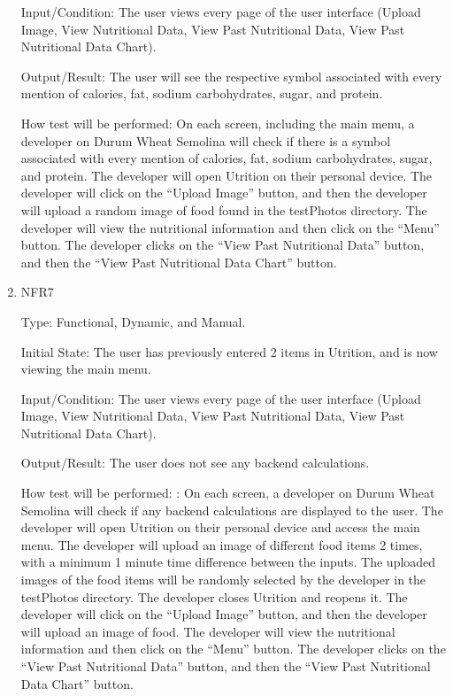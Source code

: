\documentclass[12pt, titlepage]{article}
\begin{document}
\begin{enumerate}
		Input/Condition: The user views every page of the user interface (Upload Image, View Nutritional Data, View Past Nutritional Data, View Past Nutritional Data Chart).
		
		Output/Result: The user will see the respective symbol associated with every mention of calories, fat, sodium carbohydrates, sugar, and protein.
		
		How test will be performed: On each screen, including the main menu, a developer on Durum Wheat Semolina will check if there is a symbol associated with every mention of calories, fat, sodium carbohydrates, sugar, and protein. The developer will open Utrition on their personal device. The developer will click on the “Upload Image” button, and then the developer will upload a random image of food found in the testPhotos directory. The developer will view the nutritional information and then click on the “Menu” button. The developer clicks on the “View Past Nutritional Data” button, and then the “View Past Nutritional Data Chart” button.
		
		\item{NFR7\\}
		
		Type: Functional, Dynamic, and Manual.
		
		Initial State: The user has previously entered 2 items in Utrition, and is now viewing the main menu.
		
		Input/Condition: The user views every page of the user interface (Upload Image, View Nutritional Data, View Past Nutritional Data, View Past Nutritional Data Chart).
		
		Output/Result: The user does not see any backend calculations.
		
		How test will be performed: : On each screen, a developer on Durum Wheat Semolina will check if any backend calculations are displayed to the user. The developer will open Utrition on their personal device and access the main menu. The developer will upload an image of different food items 2 times, with a minimum 1 minute time difference between the inputs. The uploaded images of the food items will be randomly selected by the developer in the testPhotos directory. The developer closes Utrition and reopens it. The developer will click on the “Upload Image” button, and then the developer will upload an image of food. The developer will view the nutritional information and then click on the “Menu” button. The developer clicks on the “View Past Nutritional Data'' button, and then the “View Past Nutritional Data Chart” button.
		

\end{enumerate}
\end{document}
